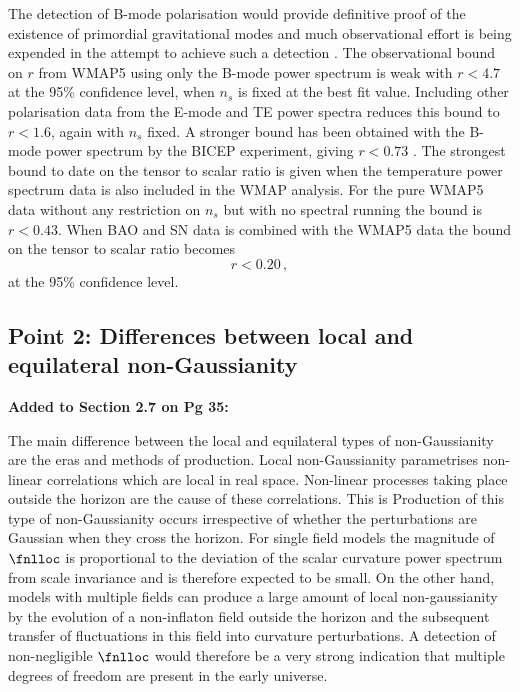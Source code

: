 The detection of B-mode polarisation would provide definitive proof of the existence of primordial
gravitational modes and much observational effort is being expended in the attempt to achieve such
a detection \cite{Seljak:1996gy, Baumann:2008aq,Chiang:2009xs,Piacentini2006,Sievers2007,vpj}.
The observational bound on $r$ from WMAP5 using only the B-mode power spectrum
is weak with $r< 4.7$ at the 95\% confidence level, when $n_s$ is fixed at the best fit value.
Including other polarisation data from the E-mode and TE power spectra reduces this bound to
$r<1.6$, again with $n_s$ fixed. A stronger bound has been obtained with the B-mode
power spectrum by the BICEP experiment, giving $r<0.73$ \cite{Chiang:2009xs}. The
strongest bound to date on the tensor to scalar ratio is given when the temperature power spectrum
data is also included in the WMAP analysis. For the pure WMAP5 data without any restriction on
$n_s$ but with no spectral running the bound is $r<0.43$. When BAO and SN data is combined with the
WMAP5 data the bound on the tensor to scalar ratio becomes
% 
\begin{equation}
\label{eq:rbound-corr}
 r < 0.20\,,
\end{equation}
at the 95\% confidence level. 

\subsection{Point 2: Differences between local and equilateral non-Gaussianity}
\textbf{Added to Section 2.7 on Pg 35:}

 The main difference between the local and equilateral types of non-Gaussianity are the eras
and methods of production. Local
non-Gaussianity parametrises non-linear correlations which are local in real space. Non-linear
processes taking place outside the horizon are the cause of these correlations. This is   
Production of this type of non-Gaussianity occurs irrespective of whether the perturbations
are Gaussian when they cross the horizon. 
For single field models the magnitude
of $\fnlloc$ is proportional to the deviation of the scalar curvature power spectrum from scale
invariance and is therefore expected to be small. On the other hand, models with multiple fields 
can produce a large amount of local non-gaussianity by the evolution of a non-inflaton field 
outside the horizon and the subsequent transfer of fluctuations in this field into curvature
perturbations. A detection of non-negligible $\fnlloc$ would therefore be a very strong indication
that multiple degrees of freedom are present in the early universe.

